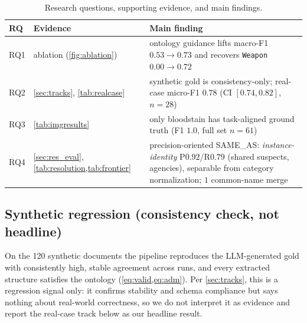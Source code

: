 \documentclass[conference]{IEEEtran}
\newcommand{\rel}[1]{\textup{\MakeUppercase{#1}}}
\newcommand{\node}[1]{\texttt{#1}}
\begin{document}
\begin{table}[t]
  \centering
  \caption{Research questions, supporting evidence, and main findings.}
  \label{tab:rqs}
  \footnotesize
  \setlength{\tabcolsep}{3.5pt}
  \begin{tabular}{@{}P{0.6cm}P{2.0cm}P{4.5cm}@{}}
    \toprule
    \textbf{RQ} & \textbf{Evidence} & \textbf{Main finding} \\
    \midrule
    RQ1 & ablation (\cref{fig:ablation}) & ontology guidance lifts macro-F1 $0.53\!\to\!0.73$ and recovers \node{Weapon} $0.00\!\to\!0.72$ \\
    RQ2 & \cref{sec:tracks}, \cref{tab:realcase} & synthetic gold is consistency-only; real-case micro-F1 $0.78$ (CI $[0.74,0.82]$, $n{=}28$) \\
    RQ3 & \cref{tab:imgresults} & only bloodstain has task-aligned ground truth (F1 $1.0$, full set $n{=}61$) \\
    RQ4 & \cref{sec:res_eval}, \cref{tab:resolution,tab:frontier} & precision-oriented \rel{same\_as}: \emph{instance-identity} P$0.92$/R$0.79$ (shared suspects, agencies), separable from category normalization; $1$ common-name merge \\
    \bottomrule
  \end{tabular}
\end{table}

\subsection{Synthetic regression (consistency check, not headline)}
On the 120 synthetic documents the pipeline reproduces the LLM-generated gold
with consistently high, stable agreement across runs, and every extracted
structure satisfies the ontology (\cref{eq:valid,eq:adm}). Per \cref{sec:tracks},
this is a regression signal only: it confirms stability and schema compliance but
says nothing about real-world correctness, so we do not interpret it as evidence
and report the real-case track below as our headline result.
\end{document}
